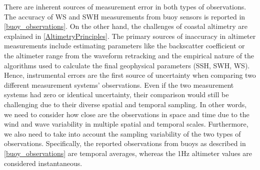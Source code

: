 There are inherent sources of measurement error in both types of observations. The accuracy of WS and SWH measurements from buoy sensors is reported in \ref{buoy_observations}. On the other hand, the challenges of coastal altimetry are explained in \ref{AltimetryPrinciples}. The primary sources of inaccuracy in altimeter measurements include estimating parameters like the backscatter coefficient or the altimeter range from the waveform retracking and the empirical nature of the algorithms used to calculate the final geophysical parameters (SSH, SWH, WS). Hence, instrumental errors are the first source of uncertainty when comparing two different measurement systems' observations. Even if the two measurement systems had zero or identical uncertainty, their comparison would still be challenging due to their diverse spatial and temporal sampling. In other words, we need to consider how close are the observations in space and time due to the wind and wave variability in multiple spatial and temporal scales. Furthermore, we also need to take into account the sampling variability of the two types of observations. Specifically, the reported observations from buoys as described in \ref{buoy_observations} are temporal averages, whereas the 1Hz altimeter values are considered instantaneous.


